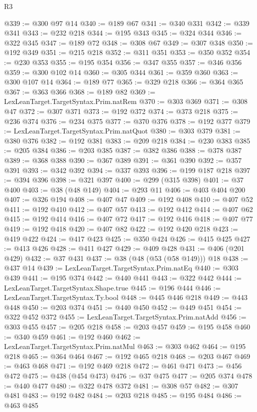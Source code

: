 \begin{lexlean}{R3}
\begin{coremodule}
@339 := @300 @97 @14
@340 := @189 @67
@341 := @340 @331
@342 := @339 @341
@343 := @232 @218
@344 := @195 @343
@345 := @324 @344
@346 := @322 @345
@347 := @189 @72
@348 := @308 @67
@349 := @307 @348
@350 := @192 @349
@351 := @215 @218
@352 := @311 @351
@353 := @350 @352
@354 := @230 @353
@355 := @195 @354
@356 := @347 @355
@357 := @346 @356
@359 := @300 @102 @14
@360 := @305 @344
@361 := @359 @360
@363 := @300 @107 @14
@364 := @189 @77
@365 := @329 @218
@366 := @364 @365
@367 := @363 @366
@368 := @189 @82
@369 := LexLeanTarget.TargetSyntax.Prim.natRem
@370 := @303 @369
@371 := @308 @47
@372 := @307 @371
@373 := @192 @372
@374 := @373 @218
@375 := @236 @374
@376 := @234 @375
@377 := @370 @376
@378 := @192 @377
@379 := LexLeanTarget.TargetSyntax.Prim.natQuot
@380 := @303 @379
@381 := @380 @376
@382 := @192 @381
@383 := @209 @218
@384 := @230 @383
@385 := @205 @384
@386 := @203 @385
@387 := @382 @386
@388 := @378 @387
@389 := @368 @388
@390 := @367 @389
@391 := @361 @390
@392 := @357 @391
@393 := @342 @392
@394 := @337 @393
@396 := @199 @187 @218
@397 := @394 @396
@398 := @321 @397
@400 := @299 (@315 @398)
@401 := @37 @400
@403 := @38 (@48 @149)
@404 := @293 @11
@406 := @403 @404 @200
@407 := @326 @194
@408 := @407 @47
@409 := @192 @408
@410 := @407 @52
@411 := @192 @410
@412 := @407 @57
@413 := @192 @412
@414 := @407 @62
@415 := @192 @414
@416 := @407 @72
@417 := @192 @416
@418 := @407 @77
@419 := @192 @418
@420 := @407 @82
@422 := @192 @420 @218
@423 := @419 @422
@424 := @417 @423
@425 := @350 @424
@426 := @415 @425
@427 := @413 @426
@428 := @411 @427
@429 := @409 @428
@431 := @406 (@201 @429)
@432 := @37 @431
@437 := @38 (@48 (@53 (@58 @149))) @18
@438 := @437 @14
@439 := LexLeanTarget.TargetSyntax.Prim.natEq
@440 := @303 @439
@441 := @195 @374
@442 := @440 @441
@443 := @322 @442
@444 := LexLeanTarget.TargetSyntax.Shape.true
@445 := @196 @444
@446 := LexLeanTarget.TargetSyntax.Ty.bool
@448 := @445 @446 @218
@449 := @443 @448
@450 := @203 @374
@451 := @440 @450
@452 := @449 @451
@454 := @322 @452 @372
@455 := LexLeanTarget.TargetSyntax.Prim.natAdd
@456 := @303 @455
@457 := @205 @218
@458 := @203 @457
@459 := @195 @458
@460 := @340 @459
@461 := @192 @460
@462 := LexLeanTarget.TargetSyntax.Prim.natMul
@463 := @303 @462
@464 := @195 @218
@465 := @364 @464
@467 := @192 @465 @218
@468 := @203 @467
@469 := @463 @468
@471 := @192 @469 @218
@472 := @461 @471
@473 := @456 @472
@475 := @438 (@454 @473)
@476 := @37 @475
@477 := @205 @374
@478 := @440 @477
@480 := @322 @478 @372
@481 := @308 @57
@482 := @307 @481
@483 := @192 @482
@484 := @203 @218
@485 := @195 @484
@486 := @463 @485

\end{coremodule}
\end{lexlean}

